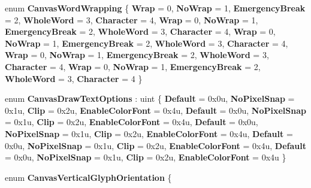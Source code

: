 \begin{DoxyCompactItemize}
enum {\bfseries Canvas\+Word\+Wrapping} \{ \newline
{\bfseries Wrap} = 0, 
{\bfseries No\+Wrap} = 1, 
{\bfseries Emergency\+Break} = 2, 
{\bfseries Whole\+Word} = 3, 
\newline
{\bfseries Character} = 4, 
{\bfseries Wrap} = 0, 
{\bfseries No\+Wrap} = 1, 
{\bfseries Emergency\+Break} = 2, 
\newline
{\bfseries Whole\+Word} = 3, 
{\bfseries Character} = 4, 
{\bfseries Wrap} = 0, 
{\bfseries No\+Wrap} = 1, 
\newline
{\bfseries Emergency\+Break} = 2, 
{\bfseries Whole\+Word} = 3, 
{\bfseries Character} = 4, 
{\bfseries Wrap} = 0, 
\newline
{\bfseries No\+Wrap} = 1, 
{\bfseries Emergency\+Break} = 2, 
{\bfseries Whole\+Word} = 3, 
{\bfseries Character} = 4, 
\newline
{\bfseries Wrap} = 0, 
{\bfseries No\+Wrap} = 1, 
{\bfseries Emergency\+Break} = 2, 
{\bfseries Whole\+Word} = 3, 
\newline
{\bfseries Character} = 4
 \}
\item 
\mbox{\label{namespace_microsoft_1_1_graphics_1_1_canvas_1_1_text_a186331309945bc8dcbfe364bc6f55fdb}} 
enum {\bfseries Canvas\+Draw\+Text\+Options} \+: uint \{ \newline
{\bfseries Default} = 0x0u, 
{\bfseries No\+Pixel\+Snap} = 0x1u, 
{\bfseries Clip} = 0x2u, 
{\bfseries Enable\+Color\+Font} = 0x4u, 
\newline
{\bfseries Default} = 0x0u, 
{\bfseries No\+Pixel\+Snap} = 0x1u, 
{\bfseries Clip} = 0x2u, 
{\bfseries Enable\+Color\+Font} = 0x4u, 
\newline
{\bfseries Default} = 0x0u, 
{\bfseries No\+Pixel\+Snap} = 0x1u, 
{\bfseries Clip} = 0x2u, 
{\bfseries Enable\+Color\+Font} = 0x4u, 
\newline
{\bfseries Default} = 0x0u, 
{\bfseries No\+Pixel\+Snap} = 0x1u, 
{\bfseries Clip} = 0x2u, 
{\bfseries Enable\+Color\+Font} = 0x4u, 
\newline
{\bfseries Default} = 0x0u, 
{\bfseries No\+Pixel\+Snap} = 0x1u, 
{\bfseries Clip} = 0x2u, 
{\bfseries Enable\+Color\+Font} = 0x4u
 \}
\item 
\mbox{\label{namespace_microsoft_1_1_graphics_1_1_canvas_1_1_text_ac948f04f716279fad132d07892e44d18}} 
enum {\bfseries Canvas\+Vertical\+Glyph\+Orientation} \{ \newline

\end{DoxyCompactItemize}
